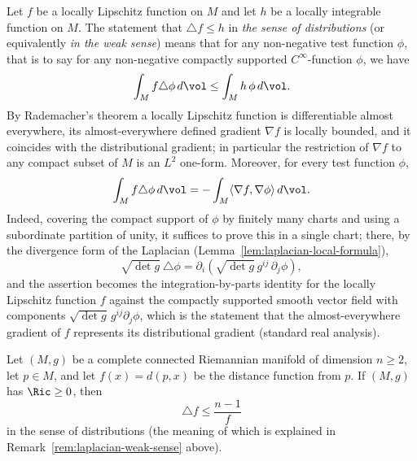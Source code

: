 \begin{remark}
\label{rem:laplacian-weak-sense}
\label{calabi}

Let $f$ be a locally Lipschitz function on $M$ and let $h$ be a
locally integrable function on $M$. The statement that $\triangle
f\leq h$ in {\sl the sense of distributions} (or equivalently {\sl
in the weak sense}) means that for any non-negative test function
$\phi$, that is to say for any non-negative compactly supported
$C^\infty$-function $\phi$, we have
$$\int_Mf\triangle \phi\, d\vol\le \int_M h\,\phi\, d\vol.$$
By Rademacher's theorem a locally Lipschitz function is
differentiable almost everywhere, its almost-everywhere defined
gradient $\nabla f$ is locally bounded, and it coincides with the
distributional gradient; in particular the restriction of $\nabla
f$ to any compact subset of $M$ is an $L^2$ one-form. Moreover, for
every test function $\phi$,
$$\int_Mf\triangle
\phi\, d\vol=-\int_M\langle \nabla f,\nabla\phi\rangle\, d\vol.$$
Indeed, covering the compact support of $\phi$ by finitely many
charts and using a subordinate partition of unity, it suffices to
prove this in a single chart; there, by the divergence form of the
Laplacian (Lemma~\ref{lem:laplacian-local-formula}),
$$\sqrt{\det g}\ \triangle\phi
=\partial_i\left(\sqrt{\det g}\,g^{ij}\,\partial_j\phi\right),$$
and the assertion becomes the integration-by-parts identity for the
locally Lipschitz function $f$ against the compactly supported
smooth vector field with components $\sqrt{\det
g}\,g^{ij}\partial_j\phi$, which is the statement that the
almost-everywhere gradient of $f$ represents its distributional
gradient (standard real analysis).
\end{remark}

\begin{example}
\label{ex:distance-function-laplacian}

Let $(M,g)$ be a complete connected Riemannian manifold of
dimension $n\ge2$, let $p\in M$, and let $f(x)=d(p,x)$ be the
distance function from $p$. If $(M, g)$ has
$\Ric \geq 0$, then
\[ \triangle f \leq \frac{n-1}{f} \]
 in the sense of distributions (the meaning of which is explained
in Remark~\ref{rem:laplacian-weak-sense} above).
\end{example}

